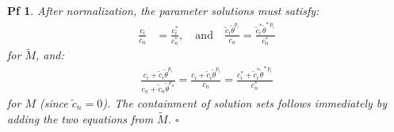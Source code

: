 \documentclass[10pt,a4paper]{amsart}
\newtheorem{pf}{Pf}
\begin{document}
\begin{pf}
After normalization, the parameter solutions must satisfy:
\begin{align*}
\frac{c_i}{c_n} &= \frac{c^*_i}{c_n^*}, \quad \text{and} \quad \frac{\tilde{c}_i \tilde{\theta}^{p_i}}{c_n} = \frac{\tilde{c}_i^* \tilde{\theta}^{*~p_i}}{c_n^*}
\end{align*}
for $\tilde{M}$, and:
\begin{align*}
\frac{c_i + \tilde{c}_i \tilde{\theta}^{p_i}}{c_n + \tilde{c}_n \tilde{\theta}^{p_n}} = \frac{c_i + \tilde{c}_i \tilde{\theta}^{p_i}}{c_n} = \frac{c^*_i + \tilde{c}_i^* \tilde{\theta}^{*~p_i}}{c_n^*}
\end{align*}
for $M$ (since $\tilde{c}_n = 0$). The containment of solution sets follows immediately by adding the two equations from $\tilde{M}$. $\square$ 
\end{pf}
\end{document}
